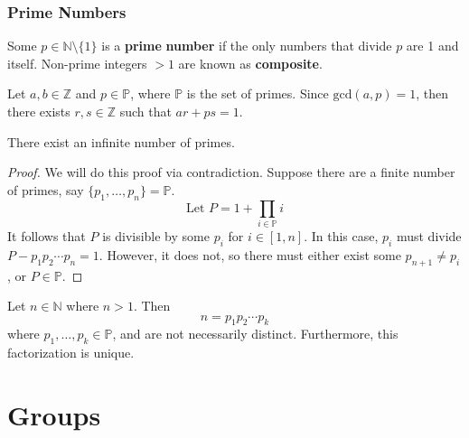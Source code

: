 \documentclass[12pt, letterpaper]{report}
\begin{document}
\subsection*{Prime Numbers}
Some \(p\in\mathbb{N} \setminus \{ 1 \} \) is a \textbf{prime} \textbf{number} if the only numbers that divide \(p\) are 1 and itself. Non-prime integers \(>1\) are known as \textbf{composite}.
\begin{lemma}[Euclid]
	Let \(a,b\in\mathbb{Z} \) and \(p\in\mathbb{P} \), where \(\mathbb{P} \) is the set of primes. Since \(\text{gcd}(a,p)=1 \), then there exists \(r,s\in\mathbb{Z} \) such that \(ar+ps=1\).
\end{lemma}
\begin{theorem}[Euclid]
	There exist an infinite number of primes.
\end{theorem}
\begin{proof}
	We will do this proof via contradiction. Suppose there are a finite number of primes, say \(\{ p_1,\ldots,p_n \}=\mathbb{P}  \).
	\[
		\text{Let } P=1+\prod _{i\in\mathbb{P} }i
	\]
	It follows that \(P\) is divisible by some \(p_i\) for \(i\in[1,n]\). In this case, \(p_i\) must divide \(P-p_1 p_2 \cdots p_n=1\). However, it does not, so there must either exist some \(p_{n+1}\neq p_i \), or \(P\in\mathbb{P} \).
\end{proof}
\begin{theorem}
	Let \(n\in\mathbb{N} \) where \(n>1\). Then 
	\[
		n=p_1 p_2 \cdots p_k
	\]
	where \(p_1,\ldots,p_k\in\mathbb{P} \), and are not necessarily distinct. Furthermore, this factorization is unique.
\end{theorem}


\chapter{Groups}
\end{document}
